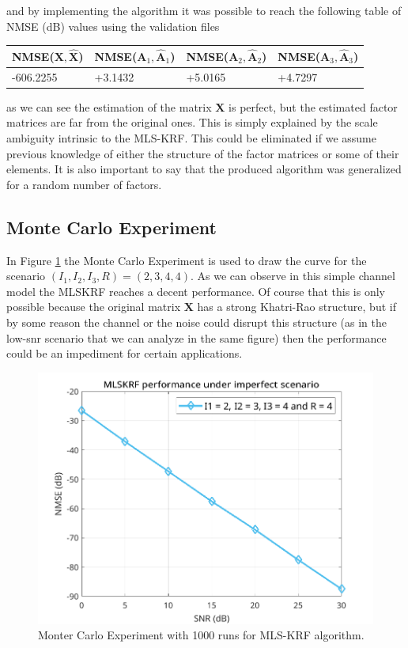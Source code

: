 \documentclass[a4paper,10pt]{article}
\begin{document}
    and by implementing the algorithm it was possible to reach the following table of NMSE (dB) values using the validation files 

    \begin{table}[ht!]
        \centering
        \begin{tabular}{|l|l|l|l|}
        \hline
        NMSE($\boldsymbol{X}, \boldsymbol{\hat{X}}$) & NMSE($\boldsymbol{A}_{1}, \boldsymbol{\hat{A}}_{1}$) & NMSE($\boldsymbol{A}_{2}, \boldsymbol{\hat{A}}_{2}$) & NMSE($\boldsymbol{A}_{3}, \boldsymbol{\hat{A}}_{3}$) \\ \hline
        -606.2255 & +3.1432 & +5.0165 & +4.7297 \\ \hline
        \end{tabular}
    \end{table}

    as we can see the estimation of the matrix $\boldsymbol{X}$ is perfect, but the estimated factor matrices are far from the original ones. This is simply explained by 
    the scale ambiguity intrinsic to the MLS-KRF. This could be eliminated if we assume previous knowledge of either the structure of the factor matrices or some of their elements.
    It is also important to say that the produced algorithm was generalized for a random number of factors.

    \subsection*{Monte Carlo Experiment}

    In Figure \ref{fig:hw9} the Monte Carlo Experiment is used to draw the curve for the scenario $(I_{1},I_{2},I_{3},R) = (2,3,4,4)$.
    As we can observe in this simple channel model the MLSKRF reaches a decent performance. Of course that this is only possible because the original matrix $\boldsymbol{X}$ has
    a strong Khatri-Rao structure, but if by some reason the channel or the noise could disrupt this structure (as in the low-snr scenario that we can analyze in the same figure) 
    then the performance could be an impediment for certain applications. 

    \begin{figure}[ht!]
        \centering 
        \includegraphics[width=0.65\linewidth]{figs/hw9.png} \par 
        \caption{Monter Carlo Experiment with 1000 runs for MLS-KRF algorithm.}
        \label{fig:hw9} 
    \end{figure}
\end{document}
